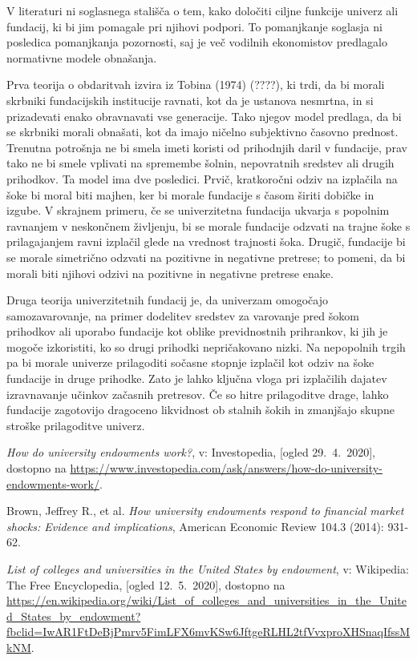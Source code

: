 \documentclass[12pt, a4paper]{article}
\begin{document}
V literaturi ni soglasnega stališča o tem, kako določiti ciljne funkcije univerz ali fundacij, ki bi jim pomagale pri njihovi podpori. To pomanjkanje soglasja ni posledica pomanjkanja pozornosti, saj je več vodilnih ekonomistov predlagalo normativne modele obnašanja. 

Prva teorija o obdaritvah izvira iz Tobina (1974) (????), ki trdi, da bi morali skrbniki fundacijskih institucije ravnati, kot da je ustanova nesmrtna, in si prizadevati enako obravnavati vse generacije. Tako njegov model predlaga, da bi se skrbniki morali obnašati, kot da imajo ničelno subjektivno časovno prednost. Trenutna potrošnja ne bi smela imeti koristi od prihodnjih daril v fundacije, prav tako ne bi smele vplivati na spremembe šolnin, nepovratnih sredstev ali drugih prihodkov. Ta model ima dve posledici. Prvič, kratkoročni odziv na izplačila na šoke bi moral biti majhen, ker bi morale fundacije s časom širiti dobičke in izgube. V skrajnem primeru, če se univerzitetna fundacija ukvarja s popolnim ravnanjem v neskončnem življenju, bi se morale fundacije odzvati na trajne šoke s prilagajanjem ravni izplačil glede na vrednost trajnosti šoka. Drugič, fundacije bi se morale simetrično odzvati na pozitivne in negativne pretrese; to pomeni, da bi morali biti njihovi odzivi na pozitivne in negativne pretrese enake.

Druga teorija univerzitetnih fundacij je, da univerzam omogočajo samozavarovanje, na primer dodelitev sredstev za varovanje pred šokom prihodkov ali uporabo fundacije kot oblike previdnostnih prihrankov, ki jih je mogoče izkoristiti, ko so drugi prihodki nepričakovano nizki. Na nepopolnih trgih pa bi morale univerze prilagoditi sočasne stopnje izplačil kot odziv na šoke fundacije in druge prihodke. Zato je lahko ključna vloga pri izplačilih dajatev izravnavanje učinkov začasnih pretresov. Če so hitre prilagoditve drage, lahko fundacije zagotovijo dragoceno likvidnost ob stalnih šokih in zmanjšajo skupne stroške prilagoditve univerz. \cite{soki}

\newpage
\begin{thebibliography}{99}

\emph{How do university endowments work?}, v: Investopedia, [ogled 29.~4.~2020], dostopno na \url{https://www.investopedia.com/ask/answers/how-do-university-endowments-work/}.

Brown, Jeffrey R., et al. \emph{How university endowments respond to financial market shocks: Evidence and implications}, American Economic Review 104.3 (2014): 931-62.

\emph{List of colleges and universities in the United States by endowment},  v: Wikipedia: The Free Encyclopedia, [ogled 12.~5.~2020], dostopno na \url{https://en.wikipedia.org/wiki/List_of_colleges_and_universities_in_the_United_States_by_endowment?fbclid=IwAR1FtDeBjPmrv5FimLFX6mvKSw6JftgeRLHL2tfVvxproXHSnaqIfssMkNM}.


\end{thebibliography}
\end{document}
